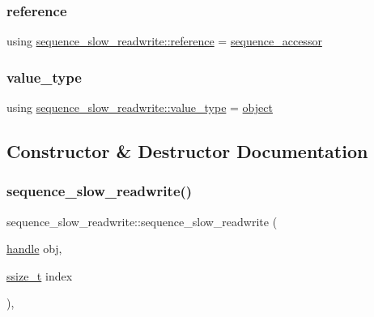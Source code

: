 \subsubsection{\texorpdfstring{reference}{reference}}
{\footnotesize\ttfamily using \mbox{\hyperlink{classsequence__slow__readwrite_ad59d36dc33d3bcff00de01c2d21ffe42}{sequence\+\_\+slow\+\_\+readwrite\+::reference}} =  \mbox{\hyperlink{pytypes_8h_afb835b9074801782e0f25a6d78d1d450}{sequence\+\_\+accessor}}\hspace{0.3cm}{\ttfamily [protected]}}

\mbox{\label{classsequence__slow__readwrite_a8ce9048b056a9f653715535c60f2d4bf}} 
\subsubsection{\texorpdfstring{value\_type}{value\_type}}
{\footnotesize\ttfamily using \mbox{\hyperlink{classsequence__slow__readwrite_a8ce9048b056a9f653715535c60f2d4bf}{sequence\+\_\+slow\+\_\+readwrite\+::value\+\_\+type}} =  \mbox{\hyperlink{classobject}{object}}\hspace{0.3cm}{\ttfamily [protected]}}



\subsection{Constructor \& Destructor Documentation}
\mbox{\label{classsequence__slow__readwrite_a955e2d54fdeeb18c53e268ca6d5aa04e}} 
\subsubsection{\texorpdfstring{sequence\_slow\_readwrite()}{sequence\_slow\_readwrite()}}
{\footnotesize\ttfamily sequence\+\_\+slow\+\_\+readwrite\+::sequence\+\_\+slow\+\_\+readwrite (\begin{DoxyParamCaption}\item[{\mbox{\hyperlink{classhandle}{handle}}}]{obj,  }\item[{\mbox{\hyperlink{detail_2common_8h_ac430d16fc097b3bf0a7469cfd09decda}{ssize\+\_\+t}}}]{index }\end{DoxyParamCaption})\hspace{0.3cm}{\ttfamily [inline]}, {\ttfamily [protected]}}



